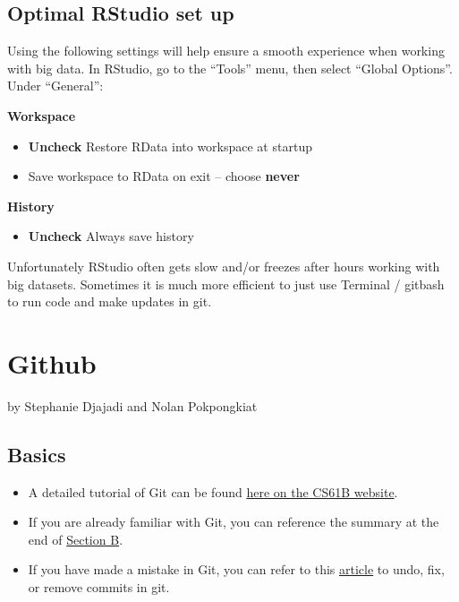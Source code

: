 \documentclass[]{book}
\providecommand{\tightlist}{%
  \setlength{\itemsep}{0pt}\setlength{\parskip}{0pt}}
\begin{document}
\hypertarget{optimal-rstudio-set-up}{%
\section{Optimal RStudio set up}\label{optimal-rstudio-set-up}}

Using the following settings will help ensure a smooth experience when working with big data. In RStudio, go to the ``Tools'' menu, then select ``Global Options''. Under ``General'':

\textbf{Workspace}

\begin{itemize}
\tightlist
\item
  \textbf{Uncheck} Restore RData into workspace at startup
\item
  Save workspace to RData on exit -- choose \textbf{never}
\end{itemize}

\textbf{History}

\begin{itemize}
\tightlist
\item
  \textbf{Uncheck} Always save history
\end{itemize}

Unfortunately RStudio often gets slow and/or freezes after hours working with big datasets. Sometimes it is much more efficient to just use Terminal / gitbash to run code and make updates in git.

\hypertarget{github}{%
\chapter{Github}\label{github}}

by Stephanie Djajadi and Nolan Pokpongkiat

\hypertarget{basics}{%
\section{Basics}\label{basics}}

\begin{itemize}
\tightlist
\item
  A detailed tutorial of Git can be found \href{https://sp19.datastructur.es/materials/guides/using-git\#b-local-repositories-narrative-introduction}{here on the CS61B website}.
\item
  If you are already familiar with Git, you can reference the summary at the end of \href{https://sp19.datastructur.es/materials/guides/using-git\#b-local-repositories-narrative-introduction}{Section B}.
\item
  If you have made a mistake in Git, you can refer to this \href{https://sethrobertson.github.io/GitFixUm/fixup.html}{article} to undo, fix, or remove commits in git.
\end{itemize}
\end{document}
